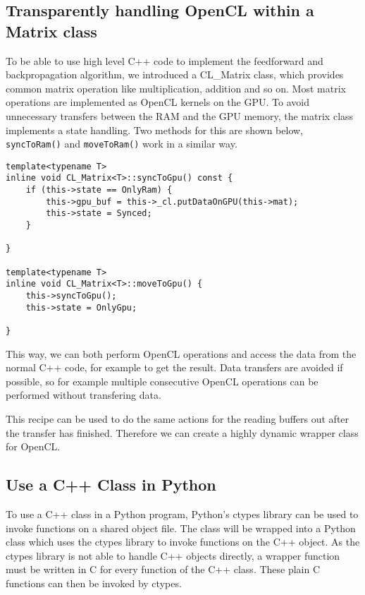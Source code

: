 \documentclass{acm_proc_article-sp}
\begin{document}
\subsection{Transparently handling OpenCL within a Matrix class}

To be able to use high level C++ code to implement the feedforward and backpropagation algorithm, we introduced a CL\_Matrix class, which provides common matrix operation like multiplication, addition and so on. Most matrix operations are implemented as OpenCL kernels on the GPU. To avoid unnecessary transfers between the RAM and the GPU memory, the matrix class implements a state handling. Two methods for this are shown below, \texttt{syncToRam()} and \texttt{moveToRam()} work in a similar way.

\begin{lstlisting}[caption=State handling to allow the Matrix data to be both used in RAM and in the GPU memory]
template<typename T>
inline void CL_Matrix<T>::syncToGpu() const {
    if (this->state == OnlyRam) {
        this->gpu_buf = this->_cl.putDataOnGPU(this->mat);
        this->state = Synced;
    }

}

template<typename T>
inline void CL_Matrix<T>::moveToGpu() {
    this->syncToGpu();
    this->state = OnlyGpu;

}
\end{lstlisting}

This way, we can both perform OpenCL operations and access the data from the normal C++ code, for example to get the result. Data transfers are avoided if possible, so for example multiple consecutive OpenCL operations can be performed without transfering data.




This recipe can be used to do the same actions for the reading buffers out after the transfer has finished.
Therefore we can create a highly dynamic wrapper class for OpenCL.

\subsection{Use a C++ Class in Python}
To use a C++ class in a Python program, Python's ctypes library can be used to invoke functions on a shared object file. The class will be wrapped into a Python class which uses the ctypes library to invoke functions on the C++ object. As the ctypes library is not able to handle C++ objects directly, a wrapper function must be written in C for every function of the C++ class. These plain C functions can then be invoked by ctypes.
\end{document}
